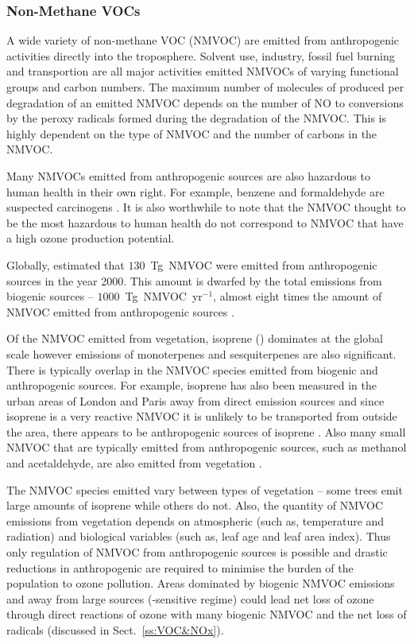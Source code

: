 \subsubsection{Non-Methane VOCs}
A wide variety of non-methane VOC (NMVOC) are emitted from anthropogenic activities directly into the troposphere.
Solvent use, industry, fossil fuel burning and transportion are all major activities emitted NMVOCs of varying functional groups and carbon numbers.
The maximum number of molecules of  produced per degradation of an emitted NMVOC depends on the number of NO to  conversions by the peroxy radicals formed during the degradation of the NMVOC.
This is highly dependent on the type of NMVOC and the number of carbons in the NMVOC.

Many NMVOCs emitted from anthropogenic sources are also hazardous to human health in their own right.
For example, benzene and formaldehyde are suspected carcinogens \citep{Laurent:2014}.
It is also worthwhile to note that the NMVOC thought to be the most hazardous to human health do not correspond to NMVOC that have a high ozone production potential.

Globally, \citet{Lamarque:2010} estimated that $130$~Tg~NMVOC were emitted from anthropogenic sources in the year 2000.
This amount is dwarfed by the total emissions from biogenic sources -- $1000$~Tg~NMVOC~yr$^{-1}$, almost eight times the amount of NMVOC emitted from anthropogenic sources \citep{Guenther:2012}.

Of the NMVOC emitted from vegetation, isoprene () dominates at the global scale however emissions of monoterpenes and sesquiterpenes are also significant.
There is typically overlap in the NMVOC species emitted from biogenic and anthropogenic sources. 
For example, isoprene has also been measured in the urban areas of London and Paris away from direct emission sources and since isoprene is a very reactive NMVOC it is unlikely to be transported from outside the area, there appears to be anthropogenic sources of isoprene \citep{vonSchneidemesser:2011}.
Also many small NMVOC that are typically emitted from anthropogenic sources, such as methanol and acetaldehyde, are also emitted from vegetation \citep{Guenther:2012}.

The NMVOC species emitted vary between types of vegetation -- some trees emit large amounts of isoprene while others do not.
Also, the quantity of NMVOC emissions from vegetation depends on atmospheric (such as, temperature and radiation) and biological variables (such as, leaf age and leaf area index).
Thus only regulation of NMVOC from anthropogenic sources is possible and drastic reductions in anthropogenic  are required to minimise the burden of the population to ozone pollution.
Areas dominated by biogenic NMVOC emissions and away from large  sources (-sensitive regime) could lead net loss of ozone through direct reactions of ozone with many biogenic NMVOC and the net loss of radicals (discussed in Sect.~\ref{ss:VOC&NOx}).

